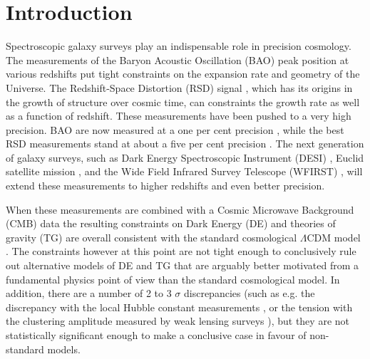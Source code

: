 


\section{Introduction} %
Spectroscopic galaxy surveys play an indispensable role in precision cosmology.
The measurements of the Baryon Acoustic Oscillation (BAO) peak position
\cite{2010deot.book..246B} at
various redshifts put tight constraints on the expansion rate and geometry of
the Universe. The Redshift-Space Distortion (RSD) signal \cite{2007MNRAS.378.1196K,1998ASSL..231..185H}, which has its origins
in the growth of structure over cosmic time, can constraints the growth rate as
well as a function of redshift. These measurements have been pushed to a very
high precision. BAO are now measured at a one per cent precision
\cite{2017MNRAS.470.2617A},  while the best RSD measurements stand at about a
five per cent precision
\cite{2017MNRAS.467.2085G,2017MNRAS.464.1640S,2017MNRAS.469.1369S,2017MNRAS.466.2242B}.
The next generation of galaxy surveys, such as Dark Energy Spectroscopic
Instrument (DESI) \cite{2016arXiv161100036D}, Euclid satellite mission
\cite{2011arXiv1110.3193L}, and the Wide Field Infrared Survey Telescope
(WFIRST) \cite{2015arXiv150303757S}, will extend these measurements to higher
redshifts and even better precision.

When these measurements are combined with a Cosmic Microwave Background (CMB)
data the resulting constraints on Dark Energy (DE) and theories of gravity
(TG) are overall consistent with the standard cosmological $\Lambda$CDM model
\cite{2018arXiv180706209P}.  The constraints however at this point are not
tight enough to conclusively rule out alternative models of DE and TG that are
arguably better motivated from a fundamental physics point of view than the
standard cosmological model. In addition, there are a number of 2 to 3 $\sigma$
discrepancies (such as e.g.  the discrepancy with the local Hubble constant
measurements \cite{2018JCAP...09..025M}, or the tension with the clustering
amplitude measured by weak lensing surveys \cite{2018MNRAS.476.2999M}), but
they are not statistically significant enough to make a conclusive case in
favour of non-standard models.
 
